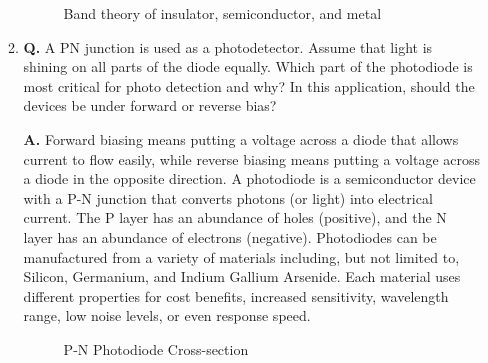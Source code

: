 \documentclass[main.tex]{subfiles}
\begin{document}
\begin{enumerate}
\begin{enumerate}
        \begin{figure}
        \centering{}
        \caption{Band theory of insulator, semiconductor, and metal}
        \label{fig:17q_a}
        \end{figure}
        
        \item \textbf{Q.} A PN junction is used as a photodetector. Assume that light is shining on all parts of the diode equally. Which part of the photodiode is most critical for photo detection and why? In this application, should the devices be under forward or reverse bias? 
        
        \textbf{A.} Forward biasing means putting a voltage across a diode that allows current to flow easily, while reverse biasing means putting a voltage across a diode in the opposite direction. A photodiode is a semiconductor device with a P-N junction that converts photons (or light) into electrical current. The P layer has an abundance of holes (positive), and the N layer has an abundance of electrons (negative). Photodiodes can be manufactured from a variety of materials including, but not limited to, Silicon, Germanium, and Indium Gallium Arsenide. Each material uses different properties for cost benefits, increased sensitivity, wavelength range, low noise levels, or even response speed. 

        \begin{figure}
        \centering{}
        \caption{P-N Photodiode Cross-section}
        \label{fig:16a_b}
        \end{figure}
        

\end{enumerate}
\end{enumerate}
\end{document}

